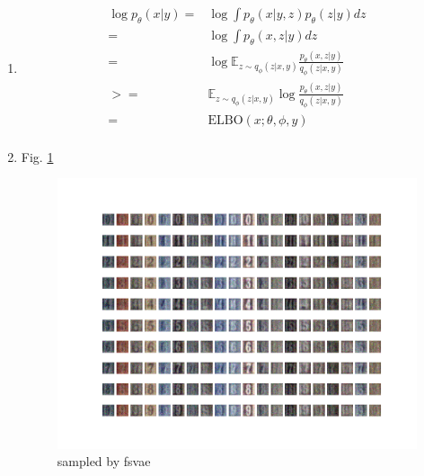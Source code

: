 \documentclass[12pt]{article}
\begin{document}
\begin{enumerate}
	\item 
	\begin{equation}
	\begin{split}
	\log p_\theta(x | y) =& \log \int p_{\theta}(x|y, z) p_{\theta}(z|y) dz \\
	=& \log \int p_{\theta} (x, z|y) dz \\
	=& \log \mathbb{E}_{z {\sim} q_\phi(z|x, y)}  \frac{p_{\theta} (x, z|y)}{q_{\phi}(z|x, y)} \\
	>=& \mathbb{E}_{z {\sim} q_\phi(z|x, y)}   \log \frac{p_{\theta} (x, z|y)}{q_{\phi}(z|x, y)}  \\
	=& \mathrm{ELBO}(x; \theta, \phi, y) \\
	\end{split}
	\end{equation}	
	
	\item Fig. \ref{fig:fsvae}
	
	\begin{figure}
		\advance\leftskip-4cm
		\includegraphics[scale=1.5]{fsvae.png}
		\caption{sampled by fsvae}
		\label{fig:fsvae}
	\end{figure}	

	
\end{enumerate}
\end{document}
